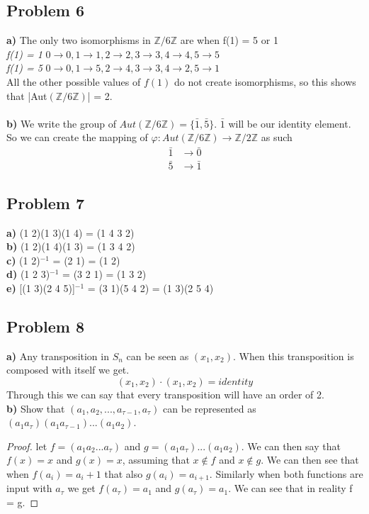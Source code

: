 \documentclass[12pt]{article}
\newcommand{\Z}{\mathbb{Z}}
\begin{document}
\subsection*{Problem 6}
\textbf{a) } The only two isomorphisms in $\Z/6\Z$ are when f(1) = 5 or 1\\
\textit{f(1) = 1} $0 \rightarrow 0, 1 \rightarrow 1, 2 \rightarrow 2, 3 \rightarrow 3, 4 \rightarrow 4, 5 \rightarrow 5$\\
\textit{f(1) = 5} $0 \rightarrow 0, 1 \rightarrow 5, 2 \rightarrow 4, 3 \rightarrow 3, 4 \rightarrow 2, 5 \rightarrow 1$\\
All the other possible values of $f(1)$ do not create isomorphisms, so  this shows that |Aut$(\Z/6\Z)$| = 2.\\\\
\textbf{b) } We write the group of $Aut(\Z/6\Z) = \{\bar{1}, \bar{5}\}$. $\bar{1}$ will be our identity element. So we can create the mapping of $\varphi: Aut(\Z/6\Z) \rightarrow \Z/2\Z$ as such\\
\begin{align*}
\bar{1} &\rightarrow \bar{0}\\
\bar{5} &\rightarrow \bar{1}
\end{align*}
\subsection*{Problem 7}
\textbf{a) } (1 2)(1 3)(1 4) = (1 4 3 2)\\
\textbf{b) } (1 2)(1 4)(1 3) = (1 3 4 2)\\
\textbf{c) } (1 2)$^{-1}$ = (2 1) = (1 2)\\
\textbf{d) } (1 2 3)$^{-1}$ = (3 2 1) = (1 3 2)\\
\textbf{e) } [(1 3)(2 4 5)]$^{-1}$ = (3 1)(5 4 2) = (1 3)(2 5 4)
\subsection*{Problem 8}
\textbf{a) } Any transposition in $S_n$ can be seen as $(x_1,x_2)$. When this transposition is composed with itself we get.
\[(x_1,x_2) \cdot (x_1,x_2) = identity\]
Through this we can say that every transposition will have an order of 2.\\
\textbf{b) } Show that $(a_1, a_2, ..., a_{\tau - 1}, a_{\tau})$ can be represented as $(a_1 a_{\tau})(a_1 a_{\tau - 1})...(a_1 a_2)$.
\begin{proof}
let $f = (a_1 a_2 ... a_{\tau})$ and $g = (a_1 a_{\tau})...(a_1 a_2)$. We can then say that $f(x) = x$ and $g(x) = x$, assuming that $x \not \in f$ and $x \not \in g$. We can then see that when $f(a_i) = a_i + 1$ that also $g(a_i) = a_{i + 1}$. Similarly when both functions are input with $a_{\tau}$ we get $f(a_{\tau}) = a_1$ and $g(a_{\tau}) = a_1$. We can see that in reality f = g.

\end{proof}
\end{document}
